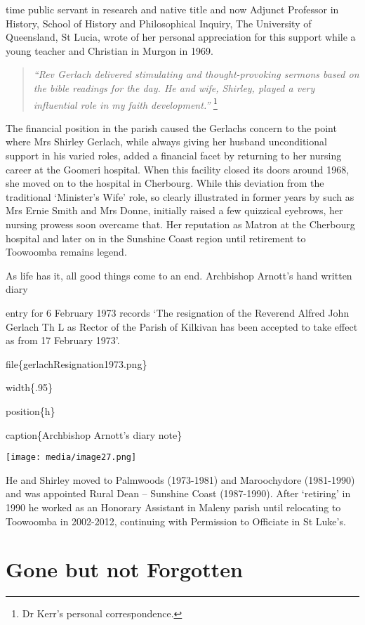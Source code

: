 time public servant in research and native title and now Adjunct
Professor in History, School of History and Philosophical Inquiry, The
University of Queensland, St Lucia, wrote of her personal appreciation
for this support while a young teacher and Christian in Murgon in 1969.

\begin{quote}
\emph{``Rev Gerlach delivered stimulating and thought-provoking sermons
based on the bible readings for the day. He and wife, Shirley, played a
very influential role in my faith development.''} \footnote{Dr Kerr's
  personal correspondence.}
\end{quote}

The financial position in the parish caused the Gerlachs concern to the
point where Mrs Shirley Gerlach, while always giving her husband
unconditional support in his varied roles, added a financial facet by
returning to her nursing career at the Goomeri hospital. When this
facility closed its doors around 1968, she moved on to the hospital in
Cherbourg. While this deviation from the traditional `Minister's Wife'
role, so clearly illustrated in former years by such as Mrs Ernie Smith
and Mrs Donne, initially raised a few quizzical eyebrows, her nursing
prowess soon overcame that. Her reputation as Matron at the Cherbourg
hospital and later on in the Sunshine Coast region until retirement to
Toowoomba remains legend.

As life has it, all good things come to an end. Archbishop Arnott's hand
written diary

entry for 6 February 1973 records `The resignation of the Reverend
Alfred John Gerlach Th L as Rector of the Parish of Kilkivan has been
accepted to take effect as from 17 February 1973'.

file\{gerlachResignation1973.png\}

width\{.95\}

position\{h\}

caption\{Archbishop Arnott's diary note\}

\texttt{[image: media/image27.png]}

He and Shirley moved to Palmwoods (1973-1981) and Maroochydore
(1981-1990) and was appointed Rural Dean -- Sunshine Coast (1987-1990).
After `retiring' in 1990 he worked as an Honorary Assistant in Maleny
parish until relocating to Toowoomba in 2002-2012, continuing with
Permission to Officiate in St Luke's.

\hypertarget{gone-but-not-forgotten}{%
\section{Gone but not Forgotten}\label{gone-but-not-forgotten}}

